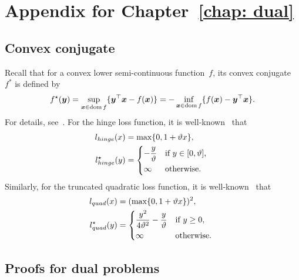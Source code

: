 \chapter{Appendix for Chapter~\ref{chap: dual}}

\section{Convex conjugate}

Recall that for a convex lower semi-continuous function~$f$, its convex conjugate~$f^*$ is defined by
\begin{equation*}
  f^{\star} (\bm{y})
  =  \sup_{\bm{x} \in \operatorname*{dom} f} \{\bm{y}^{\top}\bm{x} - f(\bm{x})\}
  = -\inf_{\bm{x} \in \operatorname*{dom} f} \{f(\bm{x}) - \bm{y}^{\top}\bm{x}\}.    
\end{equation*}
For details, see~\cite[page~91]{boyd2004convex}. For the hinge loss function, it is well-known~\cite{shnlev2014accelerated} that 
\begin{equation}\label{eq:Conjugate of hinge loss}
  \begin{aligned}
    l_{hinge}(x) & = \max\{0,1 + \vartheta x\}, \\
    l_{hinge}^{\star}(y) & =
      \begin{dcases*}
        -\frac{y}{\vartheta} & if~$y \in [0, \vartheta]$, \\
        \infty & otherwise.
      \end{dcases*}  
  \end{aligned}
\end{equation}
Similarly, for the truncated quadratic loss function, it is well-known~\cite{kanamori2013conjugate} that
\begin{equation}\label{eq:Conjugate of truncated quadratic loss}
  \begin{aligned}
    l_{quad}(x) &= (\max\{0,1 + \vartheta x\} )^2, \\
    l_{quad}^{\star}(y) & =
      \begin{dcases*}
        \frac{y^2}{4\vartheta^2} - \frac{y}{\vartheta} & if~$y \geq 0$, \\
        \infty & otherwise. \\
      \end{dcases*}  
  \end{aligned}
\end{equation}

\section{Proofs for dual problems}

